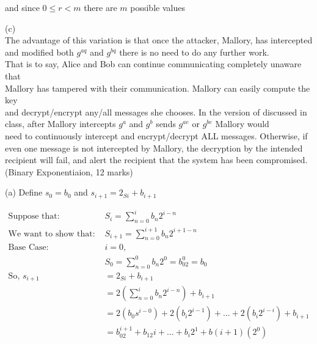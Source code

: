 \documentclass{assignment}
\begin{document}
\begin{flushleft}
\begin{problemlist}
\begin{doublespace}
and since $0 \leq r < m$ there are $m$ possible values\\
\end{doublespace}
\item[(c)]\hspace{1cm}\\
The advantage of this variation is that once the attacker, Mallory, has intercepted\\
and modified both $g^{aq}$ and $g^{bq}$ there is no need to do any further work.\\
That is to say, Alice and Bob can continue communicating completely unaware that\\
Mallory has tampered with their communication. Mallory can easily compute the key\\
and decrypt/encrypt any/all messages she chooses. In the version of discussed in\\
class, after Mallory intercepts $g^{a}$ and $g^{b}$ sends $g^{ae}$ or $g^{be}$ Mallory would\\
need to continuously intercept and encrypt/decrypt ALL messages. Otherwise, if\\
even one message is not intercepted by Mallory, the decryption by the intended\\
recipient will fail, and alert the recipient that the system has been compromised.\\
\newpage
\pbitem (Binary Exponentiaion, 12 marks)
\item [(a)] Define $s_0 = b_0$ and $s_{i+1} = 2_{Si} + b_{i+1}$\\
\begin{flushleft}
\begin{align*}
\text{Suppose that: } & S_i = \sum_{n=0}^{i} b_n2^{i-n}\\  
\text{We want to show that: }  &S_{i+1} = \sum_{n=0}^{i+1} b_n2^{i+1-n}\\ 
\text{Base Case: } &i = 0\text{,   }\\
&S_{0} = \sum_{n=0}^{0} b_n2^{0} = b_02^0 = b_0\\ 
\text{So, } s_{i+1} &= 2_{Si} + b_{i+1}\\
&= 2\left(\sum_{n=0}^{i} b_n2^{i-n}\right) + b_{i+1}\\
&= 2\left(b_0s^{i-0}\right) + 2\left(b_i2^{i-1}\right) + . . . + 2\left(b_i2^{i-i}\right) + b_{i+1}\\
&= b_02^{i+1} + b_12{i} + . . . + b_i2^1 + b(i+1)(2^0)\\

\end{align*}
\end{flushleft}
\end{problemlist}
\end{flushleft}
\end{document}
